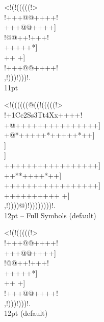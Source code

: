 \documentclass[10pt]{article}
\begin{document}
\begin{center}
{
\gnos%
<!(!(((((!>\\
!+++@@++++!\\
+++@@++++]\\
!@@++!+++!\\
+++++*]\\
++
+]\\
!+++@@++++!\\
,!)))!)))!.\\
}
11pt

{
\gnos%
<!((((((@((!(((((!>\\
!+1Cc2Ss3Tt4Xx++++!\\
+@+++++++++++++++]\\
+@*+++++*+++++*++]\\}
{\gnosb{}}{\gnos]\\}
{\gnosw{}}{\gnos]\\
+++++++++++++++++]\\
++*{\gnoswi{}}{\gnoswii{}}{\gnoswiii{}}{\gnosbi{}}{\gnosbii{}}{\gnosbiii{}}*++++*++]\\
+++++++++++++++++]\\
++++++++++
+]\\
,!))))@)!))))))))!.\\
}
12pt -- Full Symbols (default)

{
\gnos%
<!(!(((((!>\\
!+++@@++++!\\
+++@@++++]\\
!@@++!+++!\\
+++++*]\\
++
+]\\
!+++@@++++!\\
,!)))!)))!.\\
}
12pt (default)


\end{center}
\end{document}
